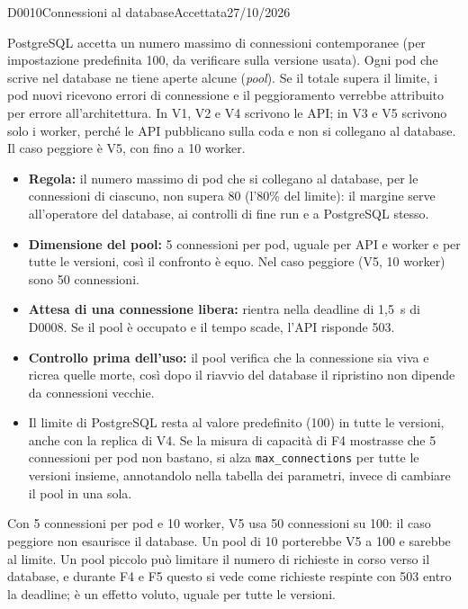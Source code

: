 \begin{decisione}{D0010}{Connessioni al database}{Accettata}{27/10/2026}

\contesto
PostgreSQL accetta un numero massimo di connessioni contemporanee (per impostazione predefinita 100, da verificare sulla versione usata). Ogni pod che scrive nel database ne tiene aperte alcune (\emph{pool}). Se il totale supera il limite, i pod nuovi ricevono errori di connessione e il peggioramento verrebbe attribuito per errore all'architettura. In V1, V2 e V4 scrivono le API; in V3 e V5 scrivono solo i worker, perché le API pubblicano sulla coda e non si collegano al database. Il caso peggiore è V5, con fino a 10 worker.

\scelta
\begin{itemize}
  \item \textbf{Regola:} il numero massimo di pod che si collegano al database, per le connessioni di ciascuno, non supera 80 (l'80\% del limite): il margine serve all'operatore del database, ai controlli di fine run e a PostgreSQL stesso.
  \item \textbf{Dimensione del pool:} 5 connessioni per pod, uguale per API e worker e per tutte le versioni, così il confronto è equo. Nel caso peggiore (V5, 10 worker) sono 50 connessioni.
  \item \textbf{Attesa di una connessione libera:} rientra nella deadline di 1,5~s di D0008. Se il pool è occupato e il tempo scade, l'API risponde 503.
  \item \textbf{Controllo prima dell'uso:} il pool verifica che la connessione sia viva e ricrea quelle morte, così dopo il riavvio del database il ripristino non dipende da connessioni vecchie.
  \item Il limite di PostgreSQL resta al valore predefinito (100) in tutte le versioni, anche con la replica di V4. Se la misura di capacità di F4 mostrasse che 5 connessioni per pod non bastano, si alza \texttt{max\_connections} per tutte le versioni insieme, annotandolo nella tabella dei parametri, invece di cambiare il pool in una sola.
\end{itemize}

\conseguenze
Con 5 connessioni per pod e 10 worker, V5 usa 50 connessioni su 100: il caso peggiore non esaurisce il database. Un pool di 10 porterebbe V5 a 100 e sarebbe al limite. Un pool piccolo può limitare il numero di richieste in corso verso il database, e durante F4 e F5 questo si vede come richieste respinte con 503 entro la deadline; è un effetto voluto, uguale per tutte le versioni.

\end{decisione}
